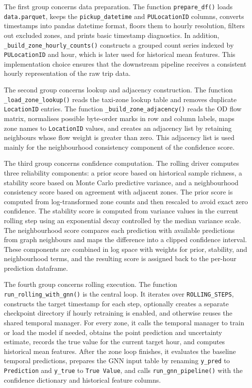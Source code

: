 \documentclass[12pt,a4paper]{report}
\begin{document}
	The first group concerns data preparation. The function \texttt{prepare\_df()} loads \texttt{data.parquet}, keeps the \texttt{pickup\_datetime} and \texttt{PULocationID} columns, converts timestamps into pandas datetime format, floors them to hourly resolution, filters out excluded zones, and prints basic timestamp diagnostics. In addition, \texttt{\_build\_zone\_hourly\_counts()} constructs a grouped count series indexed by \texttt{PULocationID} and hour, which is later used for historical mean features. This implementation choice ensures that the downstream pipeline receives a consistent hourly representation of the raw trip data.
	
	The second group concerns lookup and adjacency construction. The function \texttt{\_load\_zone\_lookup()} reads the taxi-zone lookup table and removes duplicate \texttt{LocationID} entries. The function \texttt{\_build\_zone\_adjacency()} reads the OD flow matrix, normalises possible byte-order marks in row and column labels, maps zone names to \texttt{LocationID} values, and creates an adjacency list by retaining neighbours whose flow weight is greater than zero. This adjacency list is used mainly for the neighbourhood consistency component of the confidence score.
	
	The third group concerns confidence computation. The rolling driver computes three reliability components: a prior score based on historical sample richness, a stability score based on Monte Carlo predictive variance, and a neighbourhood consistency score based on agreement with adjacent zones. The prior score is computed from log-transformed zone counts and then rescaled to avoid exact zero confidence. The stability score is computed from variance values in the current rolling step using an exponential decay controlled by the median variance scale. The neighbourhood score compares each prediction with available predictions from graph neighbours and maps the difference into a clipped confidence interval. These components are combined in log space with weights for prior, stability, and neighbourhood terms, and the resulting score is assigned back to the per-hour prediction dataframe.
	
	The fourth group concerns rolling execution. The function \texttt{run\_rolling\_with\_gnn()} is the central loop. It iterates over \texttt{ROLLING\_STEPS}, constructs the target timestamp for each step, optionally creates a separate checkpoint directory if hourly retraining is enabled, and otherwise reuses the shared temporal manager. For every zone, it calls the temporal manager to train or load the model if needed, obtains the point prediction and uncertainty estimate, records the true value for the current target hour, and computes historical mean features. After the zone loop finishes, it evaluates the baseline temporal predictions, prepares the GNN input table by renaming \texttt{y\_pred} to \texttt{Prediction} and \texttt{y\_true} to \texttt{True Value}, and calls \texttt{run\_gnn\_pipeline()} with the confidence dictionary and historical feature columns.
	
\end{document}
